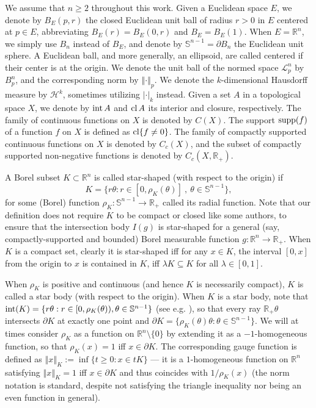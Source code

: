 \documentclass[11pt]{article}
\theoremstyle{definition}
\theoremstyle{proof}
\DeclareMathOperator{\+}{\mathop{\tilde{+}}}
\DeclareMathOperator{\interior}{\textnormal{int}}
\DeclareMathOperator{\closure}{\textnormal{cl}}
\DeclareMathOperator{\supp}{\textnormal{supp}}
\newcommand{\norm}[1]{\left\Vert#1\right\Vert}
\newcommand{\R}{\mathbb{R}}
\renewcommand{\S}{\mathbb{S}}
\renewcommand{\H}{\mathcal{H}}
\newcommand{\J}{L}
\renewcommand{\L}{\mathscr{L}}  \newcommand{\U}{U}\renewcommand{\J}{\mathcal{J}}
\numberwithin{equation}{section}
\numberwithin{equation}{section}
\begin{document}
We assume that $n \geq 2$ throughout this work. Given a Euclidean space $E$, we denote by $B_E(p,r)$ the closed Euclidean unit ball of radius $r > 0$ in $E$ centered at $p \in E$, abbreviating $B_E(r) = B_E(0,r)$ and $B_E = B_E(1)$. When $E = \R^n$, we simply use $B_n$ instead of $B_E$, and denote by $\S^{n-1} = \partial B_n$ the Euclidean unit sphere. A Euclidean ball, and more generally, an ellipsoid, are called centered if their center is at the origin. 
We denote the unit ball of the normed space $\L_p^n$ by $B_p^n$, and the corresponding norm by $\norm{\cdot}_p$. We denote the $k$-dimensional Hausdorff measure by $\H^k$, sometimes utilizing $|\cdot|_k$ instead. Given a set $A$ in a topological space $X$, we denote by $\interior A$ and $\closure A$ its interior and closure, respectively. The family of continuous functions on $X$ is denoted by $C(X)$. 
The support $\supp(f)$ of a function $f$ on $X$ is defined as $\closure \{ f \neq 0 \}$. The family of compactly supported continuous functions on $X$ is denoted by $C_c(X)$, and the subset of compactly supported non-negative functions is denoted by $C_c(X,\R_+)$. 

\medskip


A Borel subset $K \subset \R^n$ is called star-shaped (with respect to the origin) if
\[
K = \{ r \theta : r \in [0,\rho_K(\theta)] ~,~ \theta \in \S^{n-1} \} ,
\]
for some (Borel) function $\rho_K : \S^{n-1} \rightarrow \R_+$ called its radial function. Note that our definition does not require $K$ to be compact or closed like some authors, to ensure that the intersection body $I(g)$ is star-shaped for a general (say, compactly-supported and bounded) Borel measurable function $g : \R^n \rightarrow \R_+$. When $K$ is a compact set, clearly it is star-shaped iff for any $x \in K$, the interval $[0,x]$ from the origin to $x$ is contained in $K$, iff $\lambda K \subseteq K$ for all $\lambda \in [0,1]$. 

When $\rho_K$ is positive and continuous (and hence $K$ is necessarily compact), $K$ is called a star body (with respect to the origin). When $K$ is a star body, note that $\interior(K) = \{ r \theta : r \in [0,\rho_K(\theta)) , \theta \in \S^{n-1} \}$ (see e.g. \cite[Lemma 3.2]{Zhu-OrliczCentroidInqForStarBodies}), so that every ray $\R_+ \theta$ intersects $\partial K$ at exactly one point and $\partial K = \{ \rho_K(\theta) \theta : \theta \in \S^{n-1} \}$. We will at times consider $\rho_K$ as a function on $\R^n \setminus \{0\}$ by extending it as a $-1$-homogeneous function, so that $\rho_K(x) = 1$ iff $x \in \partial K$. 
The corresponding gauge function is defined as $\norm{x}_K := \inf \{ t \geq 0 : x \in t K\}$ --- it is a $1$-homogeneous function on $\R^n$ satisfying $\norm{x}_K = 1$ iff $x \in \partial K$ and thus coincides with $1/\rho_K(x)$ (the norm notation is standard, despite not satisfying the triangle inequality nor being an even function in general). 
\end{document}
